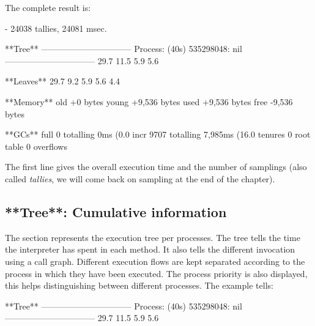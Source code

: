 \documentclass[a4paper,10pt,twoside]{book}
\begin{document}
The complete result is:

\begin{code}

 - 24038 tallies, 24081 msec.

**Tree**
--------------------------------
Process: (40s)  535298048: nil
--------------------------------
29.7%
11.5%
  5.9%
  5.6%

**Leaves**
29.7%
9.2%
5.9%
5.6%
4.4%

**Memory**
	old			+0 bytes
	young		+9,536 bytes
	used		+9,536 bytes
	free		-9,536 bytes

**GCs**
	full			0 totalling 0ms (0.0%
	incr		9707 totalling 7,985ms (16.0%
	tenures		0
	root table	0 overflows
\end{code}

The first line gives the overall execution time and the number of samplings (also called \emph{tallies}, we will come back on sampling at the end of the chapter). 

\subsection{**Tree**: Cumulative information}

The  section represents the execution tree per processes. The tree tells the time the \pharo interpreter has spent in each method. It also tells  the different invocation using a call graph. Different execution flows are kept separated according to the process in which they have been executed. The process priority is also displayed, this helps distinguishing between different processes. The example tells:

\begin{code}

**Tree**
--------------------------------
Process: (40s)  535298048: nil
--------------------------------
29.7%
11.5%
  5.9%
  5.6%
\end{code}
\end{document}
